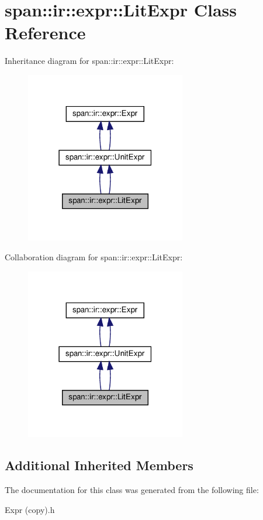\hypertarget{classspan_1_1ir_1_1expr_1_1LitExpr}{}\section{span\+:\+:ir\+:\+:expr\+:\+:Lit\+Expr Class Reference}
\label{classspan_1_1ir_1_1expr_1_1LitExpr}


Inheritance diagram for span\+:\+:ir\+:\+:expr\+:\+:Lit\+Expr\+:\nopagebreak
\begin{figure}[H]
\begin{center}
\leavevmode
\includegraphics[width=198pt]{classspan_1_1ir_1_1expr_1_1LitExpr__inherit__graph}
\end{center}
\end{figure}


Collaboration diagram for span\+:\+:ir\+:\+:expr\+:\+:Lit\+Expr\+:\nopagebreak
\begin{figure}[H]
\begin{center}
\leavevmode
\includegraphics[width=198pt]{classspan_1_1ir_1_1expr_1_1LitExpr__coll__graph}
\end{center}
\end{figure}
\subsection*{Additional Inherited Members}


The documentation for this class was generated from the following file\+:\begin{DoxyCompactItemize}
\item 
Expr (copy).\+h\end{DoxyCompactItemize}
